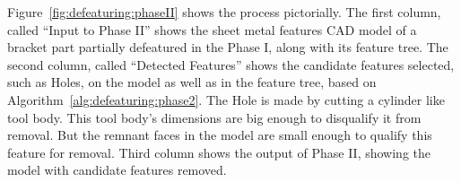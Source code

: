 Figure~\ref{fig:defeaturing:phaseII} shows the process pictorially. The first column, called ``Input to Phase II'' shows the sheet metal features CAD model of a bracket part partially defeatured in the Phase I,  along with its feature tree. The second column, called ``Detected Features'' shows the candidate features selected, such as Holes, on the model as well as in the feature tree, based on Algorithm~\ref{alg:defeaturing:phase2}. The Hole is made by cutting a cylinder like tool body. This tool body's dimensions are big enough to disqualify it from removal. But the remnant faces in the model are small enough to qualify this feature for removal. Third column shows the output of Phase II, showing the model with candidate features removed.

\bigskip

